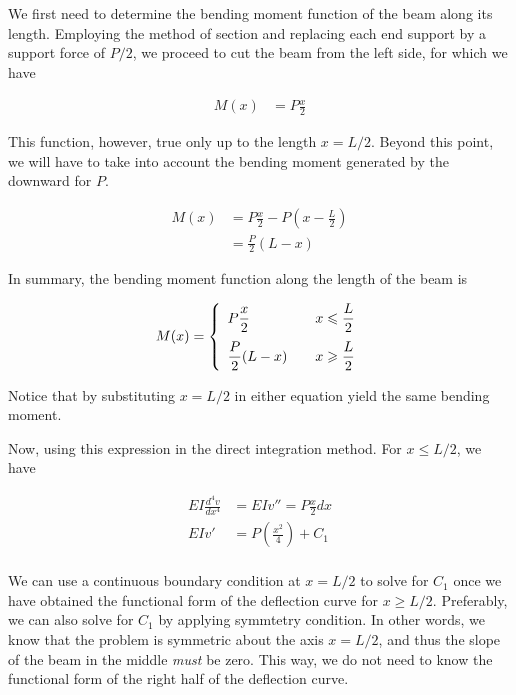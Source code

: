 \documentclass[
10pt,
a4paper,
openany,
svgnames,
]{book}
\begin{document}
\begin{solution}

  We first need to determine the bending moment function of the beam along its length. Employing the method of section and replacing each end support by a support force of $P/2$, we proceed to cut the beam from the left side, for which we have

  \begin{align*}
    M(x) &= P\frac{x}{2}
  \end{align*}

  This function, however, true only up to the length $x = L/2$. Beyond this point, we will have to take into account the bending moment generated by the downward for $P$.

  \begin{align*}
    M(x) &= P\frac{x}{2} - P(x-\frac{L}{2}) \\
         &= \frac{P}{2}(L-x)
  \end{align*}

  In summary, the bending moment function along the length of the beam is

  \begin{equation*}
    M(x) = \left\{
      \begin{array}{l l l}
        P\dfrac{x}{2} & & x \leqslant \dfrac{L}{2} \\[1em]
        \dfrac{P}{2}(L-x) & & x \geqslant \dfrac{L}{2}
      \end{array} \right.
  \end{equation*}

  Notice that by substituting $x = L/2$ in either equation yield the same bending moment. 

  Now, using this expression in the direct integration method. For $x \leqslant L/2$, we have

  \begin{align*}
    EI \frac{d^4v}{dx^4} &= EIv'' = P\frac{x}{2}dx \\
    EIv' &= P (\frac{x^2}{4}) + C_1 \\
  \end{align*}

  We can use a continuous boundary condition at $x = L/2$ to solve for $C_1$ once we have obtained the functional form of the deflection curve for $x \geqslant L/2$. Preferably, we can also solve for $C_1$ by applying symmtetry condition. In other words, we know that the problem is symmetric about the axis $x = L/2$, and thus the slope of the beam in the middle \emph{must} be zero. This way, we do not need to know the functional form of the right half of the deflection curve.


\end{solution}
\end{document}
